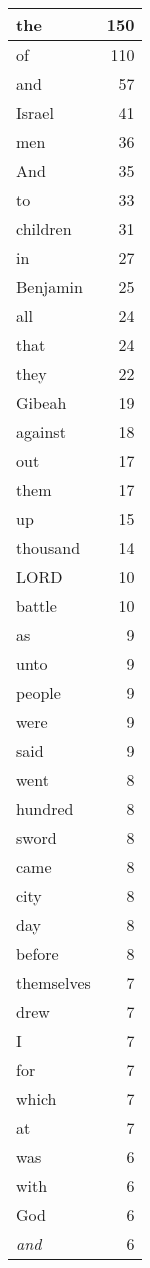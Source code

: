 \begin{center}
\begin{longtable}{l|r}
\hline \hline
\endlastfoot
the & 150 \\ \hline
of & 110 \\ \hline
and & 57 \\ \hline
Israel & 41 \\ \hline
men & 36 \\ \hline
And & 35 \\ \hline
to & 33 \\ \hline
children & 31 \\ \hline
in & 27 \\ \hline
Benjamin & 25 \\ \hline
all & 24 \\ \hline
that & 24 \\ \hline
they & 22 \\ \hline
Gibeah & 19 \\ \hline
against & 18 \\ \hline
out & 17 \\ \hline
them & 17 \\ \hline
up & 15 \\ \hline
thousand & 14 \\ \hline
LORD & 10 \\ \hline
battle & 10 \\ \hline
as & 9 \\ \hline
unto & 9 \\ \hline
people & 9 \\ \hline
were & 9 \\ \hline
said & 9 \\ \hline
went & 8 \\ \hline
hundred & 8 \\ \hline
sword & 8 \\ \hline
came & 8 \\ \hline
city & 8 \\ \hline
day & 8 \\ \hline
before & 8 \\ \hline
themselves & 7 \\ \hline
drew & 7 \\ \hline
I & 7 \\ \hline
for & 7 \\ \hline
which & 7 \\ \hline
at & 7 \\ \hline
was & 6 \\ \hline
with & 6 \\ \hline
God & 6 \\ \hline
\emph{and} & 6 \\ \hline

\end{longtable}
\end{center}
